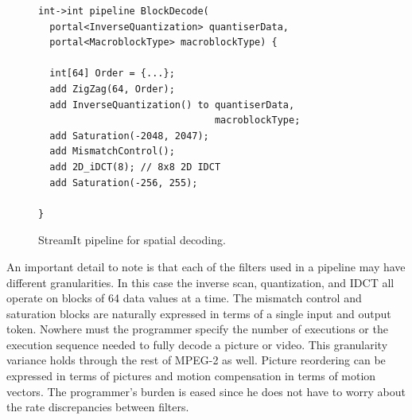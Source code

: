 \begin{figure}[h]
\end{figure}

\begin{figure}
  \begin{center}
    \begin{minipage}{3.5in}
      \begin{small}
        \begin{verbatim}
int->int pipeline BlockDecode(
  portal<InverseQuantization> quantiserData,
  portal<MacroblockType> macroblockType) {

  int[64] Order = {...};
  add ZigZag(64, Order);
  add InverseQuantization() to quantiserData,
                               macroblockType;
  add Saturation(-2048, 2047);
  add MismatchControl();
  add 2D_iDCT(8); // 8x8 2D IDCT
  add Saturation(-256, 255);

}
        \end{verbatim}
      \end{small}
    \end{minipage}
  \end{center}
 	\caption{StreamIt pipeline for spatial decoding.}
 	\label{fig:spatial_decoding0}
\end{figure}

An important detail to note is that each of the filters used in a pipeline
may have different granularities. In this case 
the inverse scan, quantization, and IDCT all operate on blocks of 64 data
values at a time. The mismatch control and saturation blocks are naturally expressed
in terms of a single input and output token. Nowhere must the programmer specify
the number of executions or the execution sequence needed to fully decode a picture
or video. This granularity variance holds through the rest of MPEG-2 as well.
Picture reordering can be expressed in terms of pictures and motion compensation in terms of motion vectors. 
The programmer's burden is eased since he does not have to worry about the rate discrepancies
between filters. 

